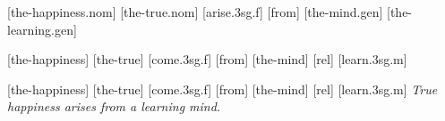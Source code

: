 \documentclass{article}
\begin{document}
\pex[lingstyle=custom_nlevel, labeltype=caps]
\a {}\par
\begingl
{}[the-happiness.{\sc nom}]
[the-true.{\sc nom}]
[arise.{\sc 3sg.f}]
[from]
[the-mind.{\sc gen}]
[the-learning.{\sc gen}]
\endgl
\a {}\par
\begingl
{}[the-happiness]
[the-true]
[come.{\sc 3sg.f}]
[from]
[the-mind]
[{\sc rel}]
[learn.{\sc 3sg.m}]
\endgl
\a \ipa{[Sa:mi:]}\par
\begingl
{}[the-happiness]
[the-true]
[come.{\sc 3sg.f}]
[from]
[the-mind]
[{\sc rel}]
[learn.{\sc 3sg.m}]
\glft \textit{True happiness arises from a learning mind.}
\endgl
\xe
\end{document}
